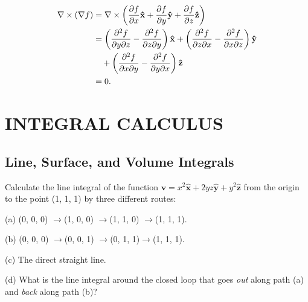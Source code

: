         \begin{sol}[1.28]
            \begin{equation}
                \begin{aligned}
                    \nabla\times(\nabla f) &= \nabla\times\left(\frac{\partial f}{\partial x}\mathbf{\hat{x}}+\frac{\partial f}{\partial y}\mathbf{\hat{y}} + \frac{\partial f}{\partial z}\mathbf{\hat{z}}\right) \\
                    &=\left(\frac{\partial^2f}{\partial y\partial z} - \frac{\partial^2 f}{\partial z \partial y}\right)\mathbf{\hat{x}} + \left(\frac{\partial^2f}{\partial z \partial x}- \frac{\partial^2f}{\partial x \partial z}\right)\mathbf{\hat{y}} \\
                    &\quad + \left(\frac{\partial^2f}{\partial x \partial y} - \frac{\partial^2 f}{\partial y \partial x}\right)\mathbf{\hat{z}} \\
                    &=0.
                \end{aligned}
            \end{equation}
        \end{sol}

\section{INTEGRAL CALCULUS}

\subsection{Line, Surface, and Volume Integrals}
\begin{prob}[1.29] Calculate the line integral of the function $\mathbf{v}=x^2\mathbf{\hat{x}} + 2yz\mathbf{\hat{y}} + y^2\mathbf{\hat{z}}$ from the origin to the point (1, 1, 1) by three different routes:

    \noindent (a) (0, 0, 0) $\rightarrow$(1, 0, 0) $\rightarrow$(1, 1, 0) $\rightarrow$(1, 1, 1).

    \noindent (b) (0, 0, 0) $\rightarrow$(0, 0, 1) $\rightarrow$(0, 1, 1)$\rightarrow$(1, 1, 1).

    \noindent (c) The direct straight line.

    \noindent (d) What is the line integral around the closed loop that goes \textit{out} along path (a) and \textit{back} along path (b)?
\end{prob}

